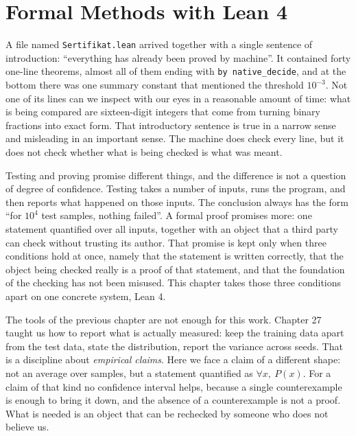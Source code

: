 \chapter{Formal Methods with Lean 4}

A file named \texttt{Sertifikat.lean} arrived together with a single sentence of introduction:
``everything has already been proved by machine''. It contained forty one-line theorems, almost all
of them ending with \texttt{by native\_decide}, and at the bottom there was one summary constant
that mentioned the threshold $10^{-3}$. Not one of its lines can we inspect with our eyes in a
reasonable amount of time: what is being compared are sixteen-digit integers that come from
turning binary fractions into exact form. That introductory sentence is true in a narrow sense and
misleading in an important sense. The machine does check every line, but it does not check whether
what is being checked is what was meant.

Testing and proving promise different things, and the difference is not a question of degree of
confidence. Testing takes a number of inputs, runs the program, and then reports what happened on
those inputs. The conclusion always has the form ``for $10^{4}$ test samples, nothing failed''. A
formal proof promises more: one statement quantified over all inputs, together with an object that
a third party can check without trusting its author. That promise is kept only when three
conditions hold at once, namely that the statement is written correctly, that the object being
checked really is a proof of that statement, and that the foundation of the checking has not been
misused. This chapter takes those three conditions apart on one concrete system, Lean 4.

The tools of the previous chapter are not enough for this work. Chapter 27 taught us how to report
what is actually measured: keep the training data apart from the test data, state the distribution,
report the variance across seeds. That is a discipline about \emph{empirical claims}. Here we face a
claim of a different shape: not an average over samples, but a statement quantified as
$\forall x,\ P(x)$. For a claim of that kind no confidence interval helps, because a single
counterexample is enough to bring it down, and the absence of a counterexample is not a proof. What
is needed is an object that can be rechecked by someone who does not believe us.

